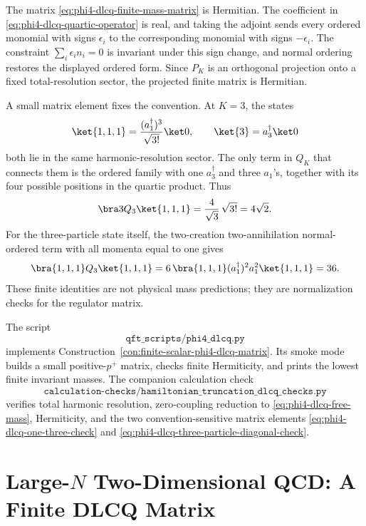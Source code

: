 The matrix \eqref{eq:phi4-dlcq-finite-mass-matrix} is Hermitian.  The
coefficient in \eqref{eq:phi4-dlcq-quartic-operator} is real, and taking the
adjoint sends every ordered monomial with signs \(\epsilon_i\) to the
corresponding monomial with signs \(-\epsilon_i\).  The constraint
\(\sum_i\epsilon_i n_i=0\) is invariant under this sign change, and normal
ordering restores the displayed ordered form.  Since \(P_K\) is an
orthogonal projection onto a fixed total-resolution sector, the projected
finite matrix is Hermitian.

A small matrix element fixes the convention.  At \(K=3\), the states
\[
  \ket{1,1,1}=\frac{(a_1^\dagger)^3}{\sqrt{3!}}\ket0,
  \qquad
  \ket{3}=a_3^\dagger\ket0
\]
both lie in the same harmonic-resolution sector.  The only term in \(Q_K\)
that connects them is the ordered family with one \(a_3^\dagger\) and three
\(a_1\)'s, together with its four possible positions in the quartic product.
Thus
\begin{equation}
  \bra3 Q_3\ket{1,1,1}
  =
  \frac{4}{\sqrt3}\,\sqrt{3!}
  =
  4\sqrt2 .
  \label{eq:phi4-dlcq-one-three-check}
\end{equation}
For the three-particle state itself, the two-creation two-annihilation
normal-ordered term with all momenta equal to one gives
\begin{equation}
  \bra{1,1,1}Q_3\ket{1,1,1}
  =
  6\,\bra{1,1,1}(a_1^\dagger)^2a_1^2\ket{1,1,1}
  =
  36.
  \label{eq:phi4-dlcq-three-particle-diagonal-check}
\end{equation}
These finite identities are not physical mass predictions; they are
normalization checks for the regulator matrix.

The script
\[
  \texttt{qft\_scripts/phi4\_dlcq.py}
\]
implements Construction~\ref{con:finite-scalar-phi4-dlcq-matrix}.  Its smoke
mode builds a small positive-\(p^+\) matrix, checks finite Hermiticity, and
prints the lowest finite invariant masses.  The companion calculation check
\[
  \texttt{calculation-checks/hamiltonian\_truncation\_dlcq\_checks.py}
\]
verifies total harmonic resolution, zero-coupling reduction to
\eqref{eq:phi4-dlcq-free-mass}, Hermiticity, and the two convention-sensitive
matrix elements \eqref{eq:phi4-dlcq-one-three-check} and
\eqref{eq:phi4-dlcq-three-particle-diagonal-check}.

\section{\texorpdfstring{Large-\(N\) Two-Dimensional QCD: A Finite DLCQ Matrix}{Large-N Two-Dimensional QCD: A Finite DLCQ Matrix}}

